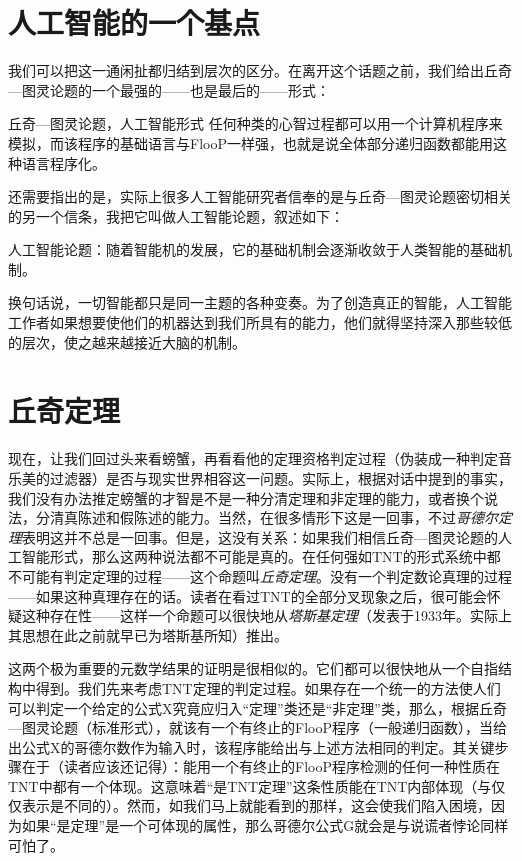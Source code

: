 \section{人工智能的一个基点}

我们可以把这一通闲扯都归结到层次的区分。在离开这个话题之前，我们给出丘奇—图灵论题的一个最强的——也是最后的——形式：

\begin{thm}[2\ccwd]{丘奇—图灵论题，人工智能形式}
任何种类的心智过程都可以用一个计算机程序来模拟，而该程序的基础语言与FlooP一样强，也就是说全体部分递归函数都能用这种语言程序化。
\end{thm}

还需要指出的是，实际上很多人工智能研究者信奉的是与丘奇—图灵论题密切相关的另一个信条，我把它叫做人工智能论题，叙述如下：

\begin{block}
人工智能论题：随着智能机的发展，它的基础机制会逐渐收敛于人类智能的基础机制。
\end{block}

换句话说，一切智能都只是同一主题的各种变奏。为了创造真正的智能，人工智能工作者如果想要使他们的机器达到我们所具有的能力，他们就得坚持深入那些较低的层次，使之越来越接近大脑的机制。

\section{丘奇定理}

现在，让我们回过头来看螃蟹，再看看他的定理资格判定过程（伪装成一种判定音乐美的过滤器）是否与现实世界相容这一问题。实际上，根据对话中提到的事实，我们没有办法推定螃蟹的才智是不是一种分清定理和非定理的能力，或者换个说法，分清真陈述和假陈述的能力。当然，在很多情形下这是一回事，不过\emph{哥德尔定理}表明这并不总是一回事。但是，这没有关系：如果我们相信丘奇—图灵论题的人工智能形式，那么这两种说法都不可能是真的。在任何强如TNT的形式系统中都不可能有判定定理的过程——这个命题叫\emph{丘奇定理}。没有一个判定数论真理的过程——如果这种真理存在的话。读者在看过TNT的全部分叉现象之后，很可能会怀疑这种存在性——这样一个命题可以很快地从\emph{塔斯基定理}（发表于1933年。实际上其思想在此之前就早已为塔斯基所知）推出。

这两个极为重要的元数学结果的证明是很相似的。它们都可以很快地从一个自指结构中得到。我们先来考虑TNT定理的判定过程。如果存在一个统一的方法使人们可以判定一个给定的公式X究竟应归入“定理”类还是“非定理”类，那么，根据丘奇—图灵论题（标准形式），就该有一个有终止的FlooP程序（一般递归函数），当给出公式X的哥德尔数作为输入时，该程序能给出与上述方法相同的判定。其关键步骤在于（读者应该还记得）：能用一个有终止的FlooP程序检测的任何一种性质在TNT中都有一个体现。这意味着“是TNT定理”这条性质能在TNT内部体现（与仅仅表示是不同的）。然而，如我们马上就能看到的那样，这会使我们陷入困境，因为如果“是定理”是一个可体现的属性，那么哥德尔公式G就会是与说谎者悖论同样可怕了。

